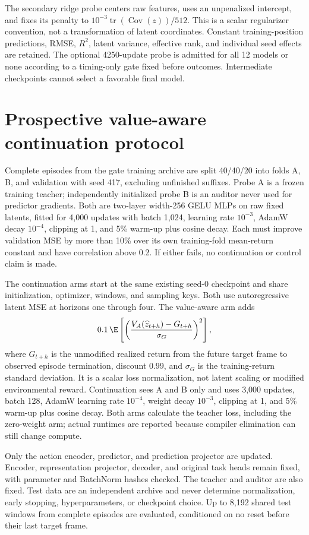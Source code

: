The secondary ridge probe centers raw features, uses an unpenalized intercept, and fixes its penalty
to $10^{-3}\operatorname{tr}(\operatorname{Cov}(z))/512$. This is a scalar regularizer convention,
not a transformation of latent coordinates. Constant training-position predictions, RMSE, $R^2$,
latent variance, effective rank, and individual seed effects are retained. The optional 4250-update
probe is admitted for all 12 models or none according to a timing-only gate fixed before outcomes.
Intermediate checkpoints cannot select a favorable final model.

\section{Prospective value-aware continuation protocol}
\label{app:pve}
Complete episodes from the gate training archive are split 40/40/20 into folds A, B, and validation
with seed 417, excluding unfinished suffixes. Probe A is a frozen training teacher; independently
initialized probe B is an auditor never used for predictor gradients. Both are two-layer width-256
GELU MLPs on raw fixed latents, fitted for 4,000 updates with batch 1,024, learning rate $10^{-3}$,
AdamW decay $10^{-4}$, clipping at 1, and 5\% warm-up plus cosine decay. Each must improve validation
MSE by more than 10\% over its own training-fold mean-return constant and have correlation above
0.2. If either fails, no continuation or control claim is made.

The continuation arms start at the same existing seed-0 checkpoint and share initialization,
optimizer, windows, and sampling keys. Both use autoregressive latent MSE at horizons one through
four. The value-aware arm adds
\[
0.1\,\E\left[\left(\frac{V_A(\widehat z_{t+h})-G_{t+h}}{\sigma_G}\right)^2\right],
\]
where $G_{t+h}$ is the unmodified realized return from the future target frame to observed episode
termination, discount 0.99, and $\sigma_G$ is the training-return standard deviation. It is a scalar
loss normalization, not latent scaling or modified environmental reward. Continuation sees A and B
only and uses 3,000 updates, batch 128, AdamW learning rate $10^{-4}$, weight decay $10^{-3}$,
clipping at 1, and 5\% warm-up plus cosine decay. Both arms calculate the teacher loss, including the
zero-weight arm; actual runtimes are reported because compiler elimination can still change compute.

Only the action encoder, predictor, and prediction projector are updated. Encoder, representation
projector, decoder, and original task heads remain fixed, with parameter and BatchNorm hashes checked.
The teacher and auditor are also fixed. Test data are an independent archive and never determine
normalization, early stopping, hyperparameters, or checkpoint choice. Up to 8,192 shared test windows
from complete episodes are evaluated, conditioned on no reset before their last target frame.

